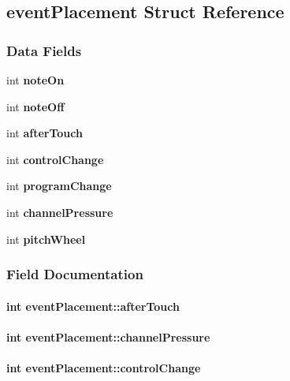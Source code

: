 \subsection{event\+Placement Struct Reference}
\label{structevent_placement}
\subsubsection*{Data Fields}
\begin{DoxyCompactItemize}
\item 
int {\bf note\+On}
\item 
int {\bf note\+Off}
\item 
int {\bf after\+Touch}
\item 
int {\bf control\+Change}
\item 
int {\bf program\+Change}
\item 
int {\bf channel\+Pressure}
\item 
int {\bf pitch\+Wheel}
\end{DoxyCompactItemize}


\subsubsection{Field Documentation}
\paragraph[{after\+Touch}]{\setlength{\rightskip}{0pt plus 5cm}int event\+Placement\+::after\+Touch}\label{structevent_placement_a08c997e580c5dbae05269956b0353607}
\paragraph[{channel\+Pressure}]{\setlength{\rightskip}{0pt plus 5cm}int event\+Placement\+::channel\+Pressure}\label{structevent_placement_aa862fb0adf136bad91e493ae93a703bb}
\paragraph[{control\+Change}]{\setlength{\rightskip}{0pt plus 5cm}int event\+Placement\+::control\+Change}\label{structevent_placement_aa4a1d84f7b34a1c3f193a940de8e0aab}
